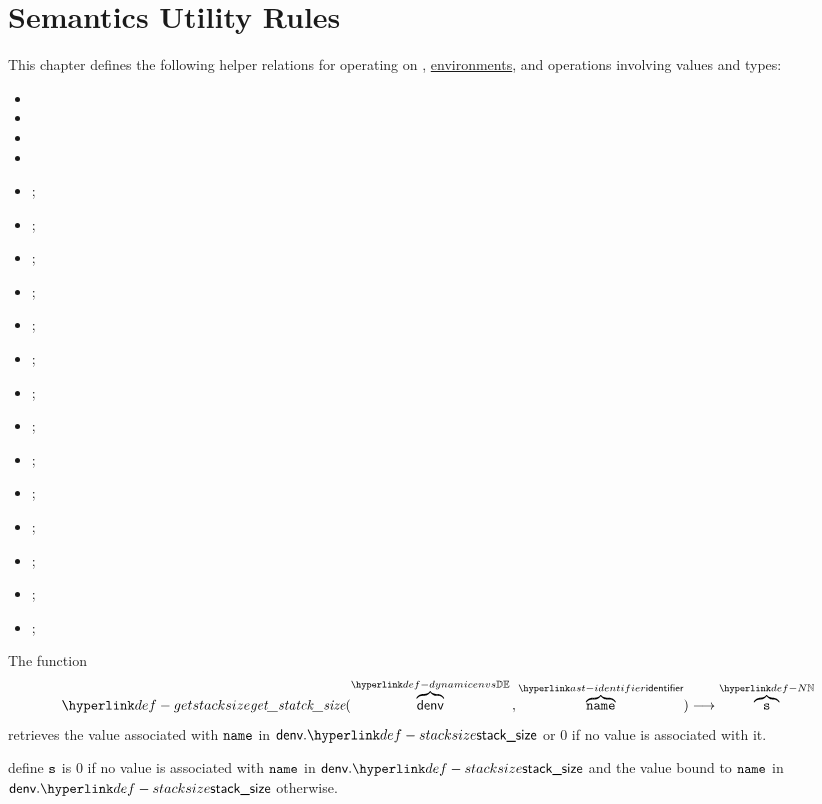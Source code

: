 \chapter{Semantics Utility Rules\label{chap:SemanticsUtilityRules}}

This chapter defines the following helper relations for operating on \nativevalues,
\hyperlink{def-envs}{environments}, and operations involving values and types:
\begin{itemize}
  \item {}
  \item {}
  \item {}
  \item {}
  \item {};
  \item {};
  \item {};
  \item {};
  \item {};
  \item {};
  \item {};
  \item {};
  \item {};
  \item {};
  \item {};
  \item {};
  \item {};
  \item {};
\end{itemize}

\hypertarget{def-getstacksize}{}
The function
\[
\getstacksize(\overname{\denv}{\dynamicenvs} \aslsep \overname{\name}{\identifier}) \aslto \overname{\vs}{\N}
\]
retrieves the value associated with $\texttt{name}$ in $\denv.\stacksize$ or $0$ if no value is associated with it.

\ProseParagraph
define $\texttt{s}$ is $0$ if no value is associated with $\texttt{name}$ in $\denv.\stacksize$ and the value bound to
$\texttt{name}$ in $\denv.\stacksize$ otherwise.

